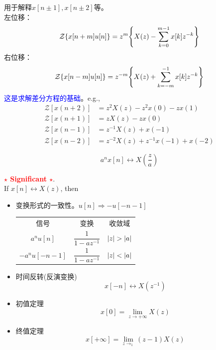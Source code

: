 \documentclass{article}
\def\zt{\mathcal{Z}}
\begin{document}
\begin{thm}[单边Z变换的位移性质]
	用于解释$x[n\pm1],x[n\pm2]$等。
	\\左位移：
	\[
		\zt\qty{x[n+m]u[n]}=
		z^{m}\qty{X(z)-\sum_{k=0}^{m-1}x[k]z^{-k}}
	\] 
	右位移：
    \[
		\zt\qty{x[n-m]u[n]}=
		z^{-m}\qty{X(z)+\sum_{k=-m}^{-1}x[k]z^{-k}}
    \]
	\textcolor{blue}{这是求解差分方程的基础}。e.g.,
	\[
	    \begin{aligned}
			\zt[x(n+2)]&=z^2X(z)-z^2x(0)-zx(1)
			\\
			\zt[x(n+1)]&=zX(z)-zx(0)
			\\
			\zt[x(n-1)]&=z^{-1}X(z)+x(-1)
			\\
			\zt[x(n-2)]&=z^{-2}X(z)+z^{-1}x(-1)+x(-2)
	    \end{aligned}
	\]
\end{thm}

\begin{thm}[Z域尺度变换]
    \[
		a^nx[n]\leftrightarrow X(\frac{z}{a})
    \] 
\end{thm}

\begin{prt}[重要性质]
	\textbf{\textcolor{red}{$\star$ Significant $\star$}}.
	\\
	If $x[n]\longleftrightarrow X(z)$, then
	\begin{itemize}
		\item 变换形式的一致性。$u[n]\Longrightarrow-u[-n-1]$
			\begin{table}[H]
				\centering
				\begin{tabular}{ccc}
					信号 & 变换 & 收敛域
					\\[6pt]
					$a^nu[n]$ & $\dfrac{1}{1-az^{-1}}$ & $\abs{z}>\abs{a}$
					\\[10pt]
					$-a^nu[-n-1]$ & $\dfrac{1}{1-az^{-1}}$ & $\abs{z}<\abs{a}$
				\end{tabular}
			\end{table}
		\item 时间反转(反演变换) 
			\[
				x[-n]\longleftrightarrow X(z^{-1})
			\]
		\item 初值定理
			\[
				x[0]=\lim_{z\to+\infty}X(z)
			\]
		\item 终值定理
			\[
				x[+\infty]=\lim_{z\to_1}(z-1)X(z)
			\] 
	\end{itemize}
\end{prt}
\end{document}
